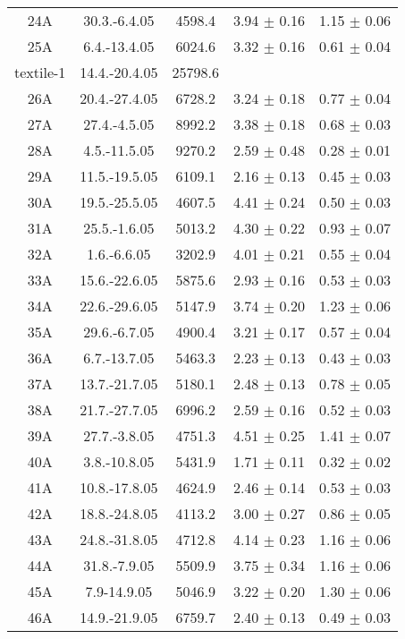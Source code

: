 \documentclass[a4paper,12pt]{article}
\begin{document}
\begin{center}
\begin{longtable}{|c|c|c|c|c|}
    24A	&	30.3.-6.4.05	&	4598.4	&	3.94 $\pm$ 0.16	&	1.15 $\pm$ 0.06	\\
    25A	&	6.4.-13.4.05	&	6024.6	&	3.32 $\pm$ 0.16	&	0.61 $\pm$ 0.04	\\
    textile-1	&	14.4.-20.4.05	&	25798.6	&		&		\\
    26A	&	20.4.-27.4.05	&	6728.2	&	3.24 $\pm$ 0.18	&	0.77 $\pm$ 0.04	\\
    27A	&	27.4.-4.5.05	&	8992.2	&	3.38 $\pm$ 0.18	&	0.68 $\pm$ 0.03	\\
    28A	&	4.5.-11.5.05	&	9270.2	&	2.59 $\pm$ 0.48	&	0.28 $\pm$ 0.01	\\
    29A	&	11.5.-19.5.05	&	6109.1	&	2.16 $\pm$ 0.13	&	0.45 $\pm$ 0.03	\\
    30A	&	19.5.-25.5.05	&	4607.5	&	4.41 $\pm$ 0.24	&	0.50 $\pm$ 0.03	\\
    31A	&	25.5.-1.6.05	&	5013.2	&	4.30 $\pm$ 0.22	&	0.93 $\pm$ 0.07	\\
    32A	&	1.6.-6.6.05	&	3202.9	&	4.01 $\pm$ 0.21	&	0.55 $\pm$ 0.04	\\
    33A	&	15.6.-22.6.05	&	5875.6	&	2.93 $\pm$ 0.16	&	0.53 $\pm$ 0.03	\\
    34A	&	22.6.-29.6.05	&	5147.9	&	3.74 $\pm$ 0.20	&	1.23 $\pm$ 0.06	\\
    35A	&	29.6.-6.7.05	&	4900.4	&	3.21 $\pm$ 0.17	&	0.57 $\pm$ 0.04	\\
    36A	&	6.7.-13.7.05	&	5463.3	&	2.23 $\pm$ 0.13	&	0.43 $\pm$ 0.03	\\
    37A	&	13.7.-21.7.05	&	5180.1	&	2.48 $\pm$ 0.13	&	0.78 $\pm$ 0.05	\\
    38A	&	21.7.-27.7.05	&	6996.2	&	2.59 $\pm$ 0.16	&	0.52 $\pm$ 0.03	\\
    39A	&	27.7.-3.8.05	&	4751.3	&	4.51 $\pm$ 0.25	&	1.41 $\pm$ 0.07	\\
    40A	&	3.8.-10.8.05	&	5431.9	&	1.71 $\pm$ 0.11	&	0.32 $\pm$ 0.02	\\
    41A	&	10.8.-17.8.05	&	4624.9	&	2.46 $\pm$ 0.14	&	0.53 $\pm$ 0.03	\\
    42A	&	18.8.-24.8.05	&	4113.2	&	3.00 $\pm$ 0.27	&	0.86 $\pm$ 0.05	\\
    43A	&	24.8.-31.8.05	&	4712.8	&	4.14 $\pm$ 0.23	&	1.16 $\pm$ 0.06	\\
    44A	&	31.8.-7.9.05	&	5509.9	&	3.75 $\pm$ 0.34	&	1.16 $\pm$ 0.06	\\
    45A	&	7.9-14.9.05	&	5046.9	&	3.22 $\pm$ 0.20	&	1.30 $\pm$ 0.06	\\
    46A	&	14.9.-21.9.05	&	6759.7	&	2.40 $\pm$ 0.13	&	0.49 $\pm$ 0.03	\\

\end{longtable}
\end{center}
\end{document}
